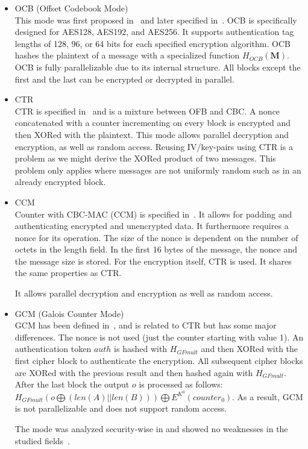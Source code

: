 \begin{itemize}
	\item OCB (Offset Codebook Mode)\\
	This mode was first proposed in~\cite{rogaway2003ocb} and later specified in~\cite{krovetz-ocb-04}. OCB is specifically designed for AES128, AES192, and AES256. It supports authentication tag lengths of 128, 96, or 64 bits for each specified encryption algorithm. OCB hashes the plaintext of a message with a specialized function $H_{OCB}(\mathbf{M})$. OCB is fully parallelizable due to its internal structure. All blocks except the first and the last can be encrypted or decrypted in parallel.
	\item CTR\\
	CTR is specified in~\cite{lipmaa2000ctr} and is a mixture between OFB and CBC. A nonce concatenated with a counter incrementing on every block is encrypted and then XORed with the plaintext. This mode allows parallel decryption and encryption, as well as random access. Reusing IV/key-pairs using CTR is a problem as we might derive the XORed product of two messages. This problem only applies where messages are not uniformly random such as in an already encrypted block.
	\item CCM\\
	Counter with CBC-MAC (CCM) is specified in~\cite{rfc3610}. It allows for padding and authenticating encrypted and unencrypted data. It furthermore requires a nonce for its operation. The size of the nonce is dependent on the number of octets in the length field. In the first 16 bytes of the message, the nonce and the message size is stored. For the encryption itself, CTR is used. It shares the same properties as CTR. 
	
	It allows parallel decryption and encryption as well as random access.
	\item GCM (Galois Counter Mode)\\
	GCM has been defined in~\cite{mcgrew2004galois}, and is related to CTR but has some major differences. The nonce is not used (just the counter starting with value 1). An authentication token $auth$ is hashed with $H_{GFmult}$ and then XORed with the first cipher block to authenticate the encryption. All subsequent cipher blocks are XORed with the previous result and then hashed again with $H_{GFmult}$. After the last block the output $o$ is processed  as follows: $H_{GFmult}(o\bigoplus (len(A)||len(B))) \bigoplus E^{K^0}(counter_0)$. As a result, GCM is not parallelizable and does not support random access.
	
	The mode was analyzed security-wise in \citeyear{mcgrew2004security} and showed no weaknesses in the studied fields~\cite{mcgrew2004security}. 
	

\end{itemize}
